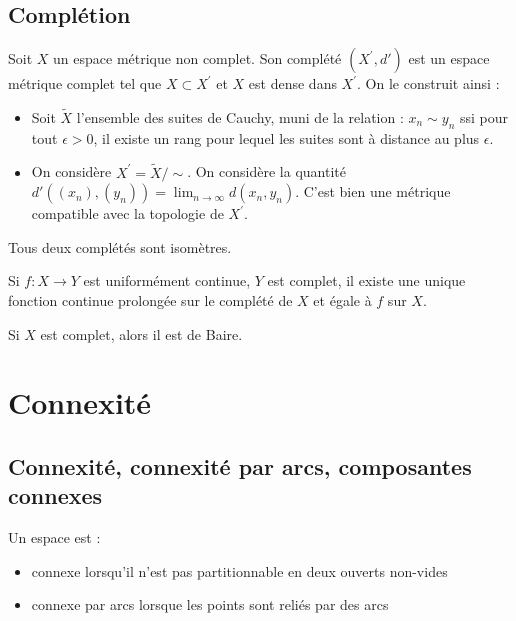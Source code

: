 \documentclass{cours}
\begin{document}
\subsection{Complétion}
\begin{definition}
    Soit $X$ un espace métrique non complet. Son complété $(X^{'}, d')$ est un espace métrique complet tel que $X \subset X^{'}$ et $X$ est dense dans $X^{'}$. On le construit ainsi :
    \begin{itemize}
        \item Soit $\tilde{X}$ l'ensemble des suites de Cauchy, muni de la relation : $x_{n} \sim y_{n}$ ssi pour tout $\epsilon > 0$, il existe un rang pour lequel les suites sont à distance au plus $\epsilon$.
        \item On considère $X^{'} = \tilde{X}/\sim$. On considère la quantité $d'((x_{n}), (y_{n})) = \lim_{n \to \infty} d(x_{n}, y_{n})$. C'est bien une métrique compatible avec la topologie de $X^{'}$.
    \end{itemize}
\end{definition}

\begin{remark}
    Tous deux complétés sont isomètres.
\end{remark}

\begin{lemma}
    Si $f : X \to Y$ est uniformément continue, $Y$ est complet, il existe une unique fonction continue prolongée sur le complété de $X$ et égale à $f$ sur $X$.
\end{lemma}

\begin{theorem}\label{thm:Bairecomplet}
    Si $X$ est complet, alors il est de Baire.
\end{theorem}

\section{Connexité}
\subsection{Connexité, connexité par arcs, composantes connexes}
\begin{definition}
    Un espace est :
    \begin{itemize}
        \item connexe lorsqu'il n'est pas partitionnable en deux ouverts non-vides
        \item connexe par arcs lorsque les points sont reliés par des arcs
    \end{itemize}
\end{definition}
\end{document}
